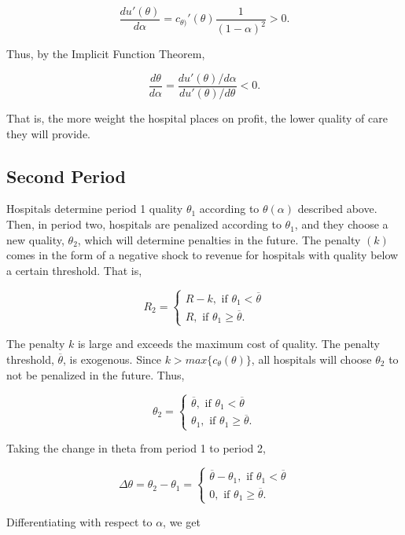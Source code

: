 \documentclass[12pt]{article}
\begin{document}
    $$\frac{du'(\theta)}{d\alpha} = c_{\theta)}'(\theta)\frac{1}{(1-\alpha)^2} > 0.$$

    Thus, by the Implicit Function Theorem, 

    $$\frac{d\theta}{d\alpha} = \frac{du'(\theta)/d\alpha}{du'(\theta)/d\theta} < 0.$$

    That is, the more weight the hospital places on profit, the lower quality of care they will provide.

    \subsection{Second Period}

    Hospitals determine period 1 quality $\theta_1$ according to $\theta(\alpha)$ described above. Then, in period two, hospitals are penalized according to $\theta_1$, and they choose a new quality, $\theta_2$, which will determine penalties in the future. The penalty $(k)$ comes in the form of a negative shock to revenue for hospitals with quality below a certain threshold. That is,

    $$R_2 = \begin{cases}
        R - k, \text{  if  } \theta_1<\overline{\theta}\\
        R, \text{  if  } \theta_1\geq \overline{\theta}.
    \end{cases}$$

    The penalty $k$ is large and exceeds the maximum cost of quality. The penalty threshold, $\overline{\theta}$, is exogenous. Since $k>max\{c_{\theta}(\theta)\}$, all hospitals will choose $\theta_2$ to not be penalized in the future. Thus,

    $$\theta_2 = \begin{cases}
        \overline{\theta}, \text{  if  } \theta_1<\overline{\theta}\\
        \theta_1, \text{  if  } \theta_1\geq \overline{\theta}.
    \end{cases}$$

    Taking the change in theta from period 1 to period 2, 

    $$\Delta\theta = \theta_2-\theta_1 = \begin{cases}
        \overline{\theta}-\theta_1, \text{  if  } \theta_1<\overline{\theta}\\
        0, \text{  if  } \theta_1\geq \overline{\theta}.
    \end{cases}$$

    Differentiating with respect to $\alpha$, we get 
\end{document}
